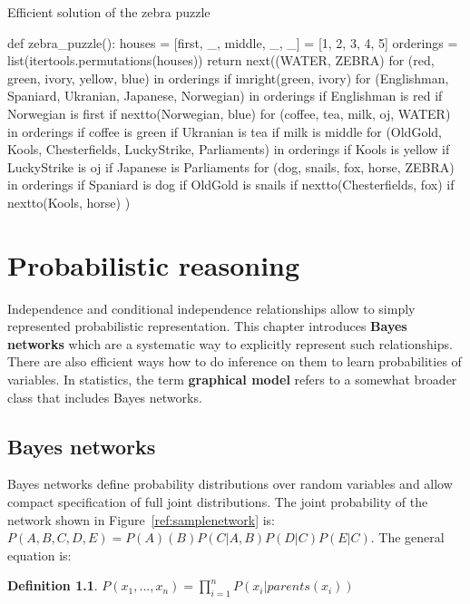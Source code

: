 \documentclass{report}
\newtheorem{definition}{Definition}[section]
\begin{document}
\begin{algorithm}
\caption{Efficient solution of the zebra puzzle}
\label{python:zebrapuzzlefast}
\begin{python}
def zebra_puzzle():
    houses = [first, _, middle, _, _] = [1, 2, 3, 4, 5]
    orderings = list(itertools.permutations(houses))
    return next((WATER, ZEBRA)
                for (red, green, ivory, yellow, blue) in orderings
                if imright(green, ivory)
                for (Englishman, Spaniard, Ukranian,
                         Japanese, Norwegian) in orderings
                if Englishman is red
                if Norwegian is first
                if nextto(Norwegian, blue)
                for (coffee, tea, milk, oj, WATER) in orderings
                if coffee is green
                if Ukranian is tea
                if milk is middle
                for (OldGold, Kools, Chesterfields, LuckyStrike,
                        Parliaments) in orderings
                if Kools is yellow
                if LuckyStrike is oj
                if Japanese is Parliaments
                for (dog, snails, fox, horse, ZEBRA) in orderings
                if Spaniard is dog
                if OldGold is snails
                if nextto(Chesterfields, fox)
                if nextto(Kools, horse)
                )
\end{python}
\end{algorithm}


\chapter{Probabilistic reasoning}
Independence and conditional independence relationships allow to simply represented probabilistic representation.
This chapter introduces {\bf Bayes networks} which are a systematic way to explicitly represent such relationships.
There are also efficient ways how to do inference on them to learn probabilities of variables.
In statistics, the term {\bf graphical model} refers to a somewhat broader class that includes Bayes networks.

\section{Bayes networks}
Bayes networks define probability distributions over random variables and allow compact specification of full joint distributions. The joint probability of the network shown in Figure~\ref{ref:samplenetwork} is: $P(A,B,C,D,E)=P(A)(B)P(C\vert A,B)P(D\vert C)P(E\vert C)$. The general equation is:
\begin{definition}
$P(x_1,...,x_n) = \prod_{i=1}^{n}{P(x_i\vert parents(x_i))}$
\end{definition}
\end{document}
